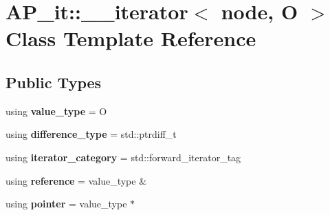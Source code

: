 \hypertarget{classAP__it_1_1____iterator}{}\section{A\+P\+\_\+it\+:\+:\+\_\+\+\_\+iterator$<$ node, O $>$ Class Template Reference}
\label{classAP__it_1_1____iterator}
\subsection*{Public Types}
\begin{DoxyCompactItemize}
\item 
\mbox{\label{classAP__it_1_1____iterator_a75d953d4a4b92a7812715bcfc0836c9c}} 
using {\bfseries value\+\_\+type} = O
\item 
\mbox{\label{classAP__it_1_1____iterator_a24fab44b4ad74c525f384feeb2aa293a}} 
using {\bfseries difference\+\_\+type} = std\+::ptrdiff\+\_\+t
\item 
\mbox{\label{classAP__it_1_1____iterator_affe71c2d2921afc842c1376fee3d4938}} 
using {\bfseries iterator\+\_\+category} = std\+::forward\+\_\+iterator\+\_\+tag
\item 
\mbox{\label{classAP__it_1_1____iterator_a1f3171a408f89aef2cd4867c33f73136}} 
using {\bfseries reference} = value\+\_\+type \&
\item 
\mbox{\label{classAP__it_1_1____iterator_accace5c026fd451cedd52ae6cb8020c9}} 
using {\bfseries pointer} = value\+\_\+type $\ast$
\end{DoxyCompactItemize}

